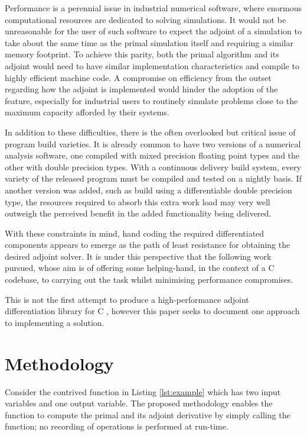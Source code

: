 \documentclass[a4paper,10pt]{article}
\def\CC{{C\nolinebreak[4]\hspace{-.05em}\raisebox{.4ex}{\tiny\bf ++}}}
\begin{document}
Performance is a perennial issue in industrial numerical software, where enormous computational resources are
dedicated to solving simulations. It would not be unreasonable for the user of such software to expect the adjoint of a
simulation to take about the same time as the primal simulation itself and requiring a similar memory footprint. To
achieve this parity, both the primal algorithm and its adjoint would need to have similar implementation characteristics
and compile to highly efficient machine code. A compromise on efficiency from the outset regarding how the adjoint is
implemented would hinder the adoption of the feature, especially for industrial users to routinely simulate problems
close to the maximum capacity afforded by their systems.

In addition to these difficulties, there is the often overlooked but critical issue of program build varieties. It is
already common to have two versions of a numerical analysis software, one compiled with mixed precision floating
point types and the other with double precision types. With a continuous delivery build system, every variety of the
released program must be compiled and tested on a nightly basis. If another version was added, such as build using a
differentiable double precision type, the resources required to absorb this extra work load may very well outweigh the
perceived benefit in the added functionality being delivered.

With these constraints in mind, hand coding the required differentiated components appears to emerge as the
path of least resistance for obtaining the desired adjoint solver. It is under this perspective that the following work
pursued, whose aim is of offering some helping-hand, in the context of a {\CC} codebase, to carrying out the task whilst
minimising performance compromises.

This is not the first attempt to produce a high-performance adjoint differentiation library for {\CC} \citep{Leppkes2017}, however this
paper seeks to document one approach to implementing a solution.


\section{Methodology}
Consider the contrived function in Listing \ref{lst:example} which has two input variables and one output variable. The proposed
methodology enables the function to compute the primal and its adjoint derivative by simply calling the function; no
recording of operations is performed at run-time.
\end{document}
